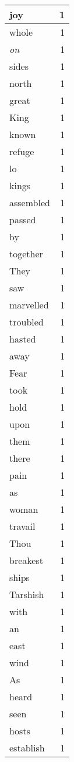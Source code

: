 \begin{center}
\begin{longtable}{l|r}
joy & 1 \\ \hline
whole & 1 \\ \hline
\emph{on} & 1 \\ \hline
sides & 1 \\ \hline
north & 1 \\ \hline
great & 1 \\ \hline
King & 1 \\ \hline
known & 1 \\ \hline
refuge & 1 \\ \hline
lo & 1 \\ \hline
kings & 1 \\ \hline
assembled & 1 \\ \hline
passed & 1 \\ \hline
by & 1 \\ \hline
together & 1 \\ \hline
They & 1 \\ \hline
saw & 1 \\ \hline
marvelled & 1 \\ \hline
troubled & 1 \\ \hline
hasted & 1 \\ \hline
away & 1 \\ \hline
Fear & 1 \\ \hline
took & 1 \\ \hline
hold & 1 \\ \hline
upon & 1 \\ \hline
them & 1 \\ \hline
there & 1 \\ \hline
pain & 1 \\ \hline
as & 1 \\ \hline
woman & 1 \\ \hline
travail & 1 \\ \hline
Thou & 1 \\ \hline
breakest & 1 \\ \hline
ships & 1 \\ \hline
Tarshish & 1 \\ \hline
with & 1 \\ \hline
an & 1 \\ \hline
east & 1 \\ \hline
wind & 1 \\ \hline
As & 1 \\ \hline
heard & 1 \\ \hline
seen & 1 \\ \hline
hosts & 1 \\ \hline
establish & 1 \\ \hline

\end{longtable}
\end{center}
